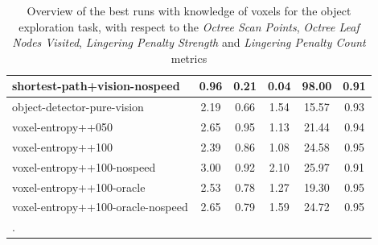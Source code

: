 \begin{table}
\begin{longtable}{|l|c|c|c|c|c|}
shortest-path+vision-nospeed & {\cellcolor[HTML]{EBF2F0}} \color[HTML]{000000} 0.96 & {\cellcolor[HTML]{EBF2F0}} \color[HTML]{000000} 0.21 & {\cellcolor[HTML]{EBF2F0}} \color[HTML]{000000} 0.04 & 98.00 & 0.91 \\ \hline
object-detector-pure-vision & {\cellcolor[HTML]{DAEAE6}} \color[HTML]{000000} 2.19 & {\cellcolor[HTML]{EBF2F0}} \color[HTML]{000000} 0.66 & {\cellcolor[HTML]{A4D0C7}} \color[HTML]{000000} 1.54 & 15.57 & 0.93 \\ \hline
voxel-entropy++050 & {\cellcolor[HTML]{D4E7E3}} \color[HTML]{000000} 2.65 & {\cellcolor[HTML]{EBF2F0}} \color[HTML]{000000} 0.95 & {\cellcolor[HTML]{DEECE9}} \color[HTML]{000000} 1.13 & 21.44 & 0.94 \\ \hline
voxel-entropy++100 & {\cellcolor[HTML]{D7E9E5}} \color[HTML]{000000} 2.39 & {\cellcolor[HTML]{EBF2F0}} \color[HTML]{000000} 0.86 & {\cellcolor[HTML]{E5EFED}} \color[HTML]{000000} 1.08 & 24.58 & 0.95 \\ \hline
voxel-entropy++100-nospeed & {\cellcolor[HTML]{CEE4E0}} \color[HTML]{000000} 3.00 & {\cellcolor[HTML]{EBF2F0}} \color[HTML]{000000} 0.92 & {\cellcolor[HTML]{55AA99}} \color[HTML]{F1F1F1} 2.10 & 25.97 & 0.91 \\ \hline
voxel-entropy++100-oracle & {\cellcolor[HTML]{D5E8E4}} \color[HTML]{000000} 2.53 & {\cellcolor[HTML]{EBF2F0}} \color[HTML]{000000} 0.78 & {\cellcolor[HTML]{CBE3DD}} \color[HTML]{000000} 1.27 & 19.30 & 0.95 \\ \hline
voxel-entropy++100-oracle-nospeed & {\cellcolor[HTML]{D4E7E3}} \color[HTML]{000000} 2.65 & {\cellcolor[HTML]{EBF2F0}} \color[HTML]{000000} 0.79 & {\cellcolor[HTML]{9DCDC3}} \color[HTML]{000000} 1.59 & 24.72 & 0.95 \\ \hline
    
        \caption{Overview of the best runs with knowledge of voxels for the object exploration task, with respect to the \textit{Octree Scan Points}, \textit{Octree Leaf Nodes Visited}, \textit{Lingering Penalty Strength} and \textit{Lingering Penalty Count} metrics}. \label{tab:results-RQ1-explorative-performance}
    \end{longtable}


\end{table}




